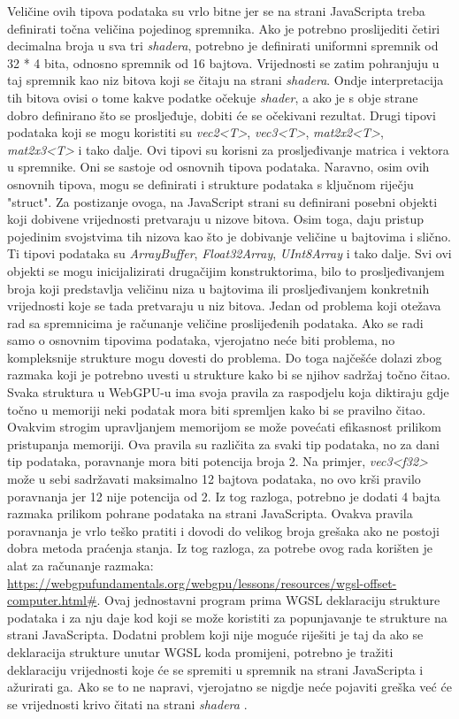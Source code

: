 \documentclass{foi}
\begin{document}
Veličine ovih tipova podataka su vrlo bitne jer se na strani JavaScripta treba definirati točna veličina pojedinog spremnika. Ako je potrebno proslijediti četiri decimalna broja u sva tri \textit{shadera}, potrebno je definirati uniformni spremnik od 32 * 4 bita, odnosno spremnik od 16 bajtova. Vrijednosti se zatim pohranjuju u taj spremnik kao niz bitova koji se čitaju na strani \textit{shadera}. Ondje interpretacija tih bitova ovisi o tome kakve podatke očekuje \textit{shader}, a ako je s obje strane dobro definirano što se prosljeđuje, dobiti će se očekivani rezultat. Drugi tipovi podataka koji se mogu koristiti su \textit{vec2<T>}, \textit{vec3<T>}, \textit{mat2x2<T>}, \textit{mat2x3<T>} i tako dalje. Ovi tipovi su korisni za prosljeđivanje matrica i vektora u spremnike. Oni se sastoje od osnovnih tipova podataka. Naravno, osim ovih osnovnih tipova, mogu se definirati i strukture podataka s ključnom riječju "struct". Za postizanje ovoga, na JavaScript strani su definirani posebni objekti koji dobivene vrijednosti pretvaraju u nizove bitova. Osim toga, daju pristup pojedinim svojstvima tih nizova kao što je dobivanje veličine u bajtovima i slično. Ti tipovi podataka su \textit{ArrayBuffer}, \textit{Float32Array}, \textit{UInt8Array} i tako dalje. Svi ovi objekti se mogu inicijalizirati drugačijim konstruktorima, bilo to prosljeđivanjem broja koji predstavlja veličinu niza u bajtovima ili prosljeđivanjem konkretnih vrijednosti koje se tada pretvaraju u niz bitova. Jedan od problema koji otežava rad sa spremnicima je računanje veličine proslijeđenih podataka. Ako se radi samo o osnovnim tipovima podataka, vjerojatno neće biti problema, no kompleksnije strukture mogu dovesti do problema. Do toga najčešće dolazi zbog razmaka koji je potrebno uvesti u strukture kako bi se njihov sadržaj točno čitao. Svaka struktura u WebGPU-u ima svoja pravila za raspodjelu koja diktiraju gdje točno u memoriji neki podatak mora biti spremljen kako bi se pravilno čitao. Ovakvim strogim upravljanjem memorijom se može povećati efikasnost prilikom pristupanja memoriji. Ova pravila su različita za svaki tip podataka, no za dani tip podataka, poravnanje mora biti potencija broja 2. Na primjer, \textit{vec3<f32>}  može u sebi sadržavati maksimalno 12 bajtova podataka, no ovo krši pravilo poravnanja jer 12 nije potencija od 2. Iz tog razloga, potrebno je dodati 4 bajta razmaka prilikom pohrane podataka na strani JavaScripta. Ovakva pravila poravnanja je vrlo teško pratiti i dovodi do velikog broja grešaka ako ne postoji dobra metoda praćenja stanja. Iz tog razloga, za potrebe ovog rada korišten je alat za računanje razmaka: \url{https://webgpufundamentals.org/webgpu/lessons/resources/wgsl-offset-computer.html#}. Ovaj jednostavni program prima WGSL deklaraciju strukture podataka i za nju daje kod koji se može koristiti za popunjavanje te strukture na strani JavaScripta. Dodatni problem koji nije moguće riješiti je taj da ako se deklaracija strukture unutar WGSL koda promijeni, potrebno je tražiti deklaraciju vrijednosti koje će se spremiti u spremnik na strani JavaScripta i ažurirati ga. Ako se to ne napravi, vjerojatno se nigdje neće pojaviti greška već će se vrijednosti krivo čitati na strani \textit{shadera} \parencite{WebGPUFundamentalsMemoryLayout}.
\end{document}
